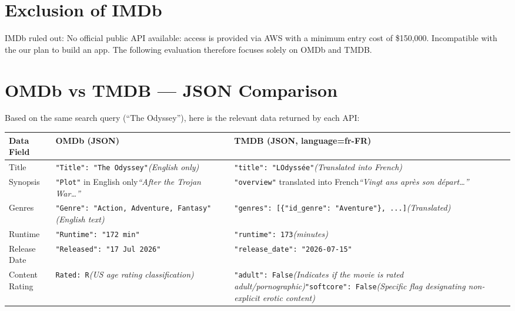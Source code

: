 \documentclass[
  french,
  11pt,
  a4paper,
]{article}
\begin{document}
\section*{Exclusion of IMDb}\label{exclusion-of-imdb}

IMDb ruled out: No official public API available: access is provided via
AWS with a minimum entry cost of \$150,000. Incompatible with the our
plan to build an app. The following evaluation therefore focuses solely
on OMDb and TMDB.

\section*{OMDb vs TMDB --- JSON
Comparison}\label{omdb-vs-tmdb-json-comparison}

Based on the same search query (``The Odyssey''), here is the relevant
data returned by each API:

\begin{longtable}[]{@{}
  >{\raggedright\arraybackslash}p{}
  >{\raggedright\arraybackslash}p{}
  >{\raggedright\arraybackslash}p{}@{}}
\toprule\noalign{}
\begin{minipage}[b]{\linewidth}\raggedright
Data Field
\end{minipage} & \begin{minipage}[b]{\linewidth}\raggedright
OMDb (JSON)
\end{minipage} & \begin{minipage}[b]{\linewidth}\raggedright
TMDB (JSON, language=fr-FR)
\end{minipage} \\
\midrule\noalign{}
\endhead
\bottomrule\noalign{}
\endlastfoot
Title & \texttt{"Title":\ "The\ Odyssey"}\emph{(English only)} &
\texttt{"title":\ "L\textquotesingle{}Odyssée"}\emph{(Translated into
French)} \\
Synopsis & \texttt{"Plot"} in English only\emph{``After the Trojan
War\ldots{}''} & \texttt{"overview"} translated into French\emph{``Vingt
ans après son départ\ldots{}''} \\
Genres & \texttt{"Genre":\ "Action,\ Adventure,\ Fantasy"}\emph{(English
text)} &
\texttt{"genres":\ {[}\{"id\_genre":\ "Aventure"\},\ ...{]}}\emph{(Translated)} \\
Runtime & \texttt{"Runtime":\ "172\ min"} &
\texttt{"runtime":\ 173}\emph{(minutes)} \\
Release Date & \texttt{"Released":\ "17\ Jul\ 2026"} &
\texttt{"release\_date":\ "2026-07-15"} \\
Content Rating &
\texttt{\textquotesingle{}Rated\textquotesingle{}:\ \textquotesingle{}R\textquotesingle{}}\emph{(US
age rating classification)} & \texttt{"adult":\ False}\emph{(Indicates
if the movie is rated
adult/pornographic)}\texttt{"softcore":\ False}\emph{(Specific flag
designating non-explicit erotic content)} \\
\end{longtable}
\end{document}
